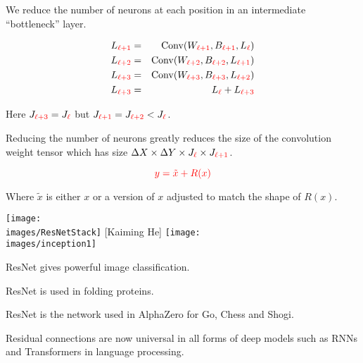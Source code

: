 {
We reduce the number of neurons at each position in an intermediate ``bottleneck'' layer.

\begin{eqnarray*}
L_{\color{red} \ell+1} & = & \mathrm{Conv}(W_{\color{red} \ell+1},B_{\color{red} \ell+1},L_{\color{red} \ell}) \\
L_{\color{red} \ell+2} & = & \mathrm{Conv}(W_{\color{red} \ell+2},B_{\color{red} \ell+2},L_{\color{red} \ell+1}) \\
L_{\color{red} \ell+3} & = & \mathrm{Conv}(W_{\color{red} \ell+3},B_{\color{red} \ell+3},L_{\color{red} \ell+2}) \\
L_{\color{red} \ell+3} & = & L_{\color{red} \ell} + L_{\color{red} \ell+3}
\end{eqnarray*}

\vfill
Here $J_{\color{red} \ell+3} = J_{\color{red} \ell}$ but $J_{\color{red} \ell+1} = J_{\color{red} \ell+2} < J_{\color{red} \ell}$.

\vfill
Reducing the number of neurons greatly reduces the size of the convolution weight tensor which has size $\Delta X \times \Delta Y \times J_{\color{red} \ell} \times J_{\color{red} \ell+1}$.


$${\color{red} y = \tilde{x} + R(x)}$$

\vfill
Where $\tilde{x}$ is either $x$ or a version of $x$ adjusted to match the shape of $R(x)$.



\centerline{\texttt{[image: \\images/ResNetStack]} {\large [Kaiming He]} \texttt{[image: \\images/inception1]}}


ResNet gives powerful image classification.

\vfill
ResNet is used in folding proteins.

\vfill
ResNet is the network used in AlphaZero for Go, Chess and Shogi.

\vfill
Residual connections are now universal in all forms of deep models such as RNNs and Transformers in language processing.


}

